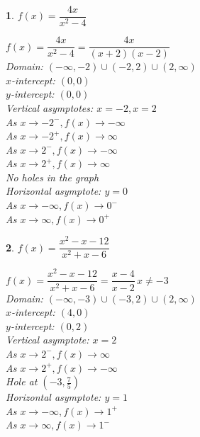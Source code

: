 \documentclass{amsbook}
\newtheorem{exc}{}
\newenvironment{ex}{\begin{exc}\normalfont}{\end{exc}}
\numberwithin{section}{chapter}
\numberwithin{equation}{chapter}
\begin{document}
\begin{multicols}{2}
\begin{ex}
		$f(x) = \dfrac{4x}{x^{2} -4}$
	\begin{sol}
		$f(x) = \dfrac{4x}{x^{2} -4} = \dfrac{4x}{(x + 2)(x - 2)}$\\
		Domain: $(-\infty, -2) \cup (-2, 2) \cup (2, \infty)$\\
		$x$-intercept:  $(0,0)$\\
		$y$-intercept:  $(0,0)$\\
		Vertical asymptotes: $x = -2, x = 2$\\
		As $x \rightarrow -2^{-}, f(x) \rightarrow -\infty$\\
		As $x \rightarrow -2^{+}, f(x) \rightarrow \infty$\\
		As $x \rightarrow 2^{-}, f(x) \rightarrow -\infty$\\
		As $x \rightarrow 2^{+}, f(x) \rightarrow \infty$\\
		No holes in the graph\\
		Horizontal asymptote: $y = 0$ \\
		As $x \rightarrow -\infty, f(x) \rightarrow 0^{-}$\\
		As $x \rightarrow \infty, f(x) \rightarrow 0^{+}$
	\end{sol}
\end{ex}

\begin{ex}
		$f(x) = \dfrac{x^2-x-12}{x^{2} +x - 6}$
	\begin{sol}
		$f(x) = \dfrac{x^2-x-12}{x^{2} +x - 6} = \dfrac{x-4}{x - 2} \, x \neq -3$\\
		Domain: $(-\infty, -3) \cup (-3, 2) \cup (2, \infty)$\\
		$x$-intercept:  $(4,0)$\\
		$y$-intercept:  $(0,2)$\\
		Vertical asymptote: $x = 2$\\
		As $x \rightarrow 2^{-}, f(x) \rightarrow \infty$\\
		As $x \rightarrow 2^{+}, f(x) \rightarrow -\infty$\\
		Hole at $\left(-3, \frac{7}{5} \right)$ \\
		Horizontal asymptote: $y = 1$ \\
		As $x \rightarrow -\infty, f(x) \rightarrow 1^{+}$\\
		As $x \rightarrow \infty, f(x) \rightarrow 1^{-}$
	\end{sol}
\end{ex}


\end{multicols}
\end{document}
